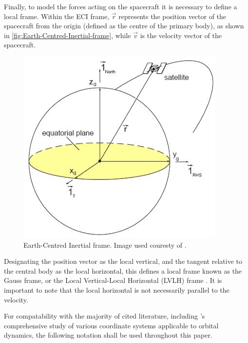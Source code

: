 Finally, to model the forces acting on the spacecraft it is necessary to define a local frame. Within the ECI frame, $\vec{r}$ represents the position vector of the spacecraft from the origin (defined as the centre of the primary body), as shown in \autoref{fig:Earth-Centred-Inertial-frame}, while $\vec{v}$ is the velocity vector of the spacecraft.
\begin{figure}[h]
\caption{Earth-Centred Inertial frame. Image used couresty of \textcite{Keppeler_thesis}.}
\label{fig:Earth-Centred-Inertial-frame}
\centering
\includegraphics[scale=0.75]{Images/ECI-frame.JPG}
\end{figure}
Designating the position vector as the local vertical, and the tangent relative to the central body as the local horizontal, this defines a local frame known as the Gauss frame, or the Local Vertical-Local Horizontal (LVLH) frame \parencite{STK}. It is important to note that the local horizontal is not necessarily parallel to the velocity.
 
For compatability with the majority of cited literature, including \textcite{Keppeler_thesis}'s comprehensive study of various coordinate systems applicable to orbital dynamics, the following notation shall be used throughout this paper.
 

